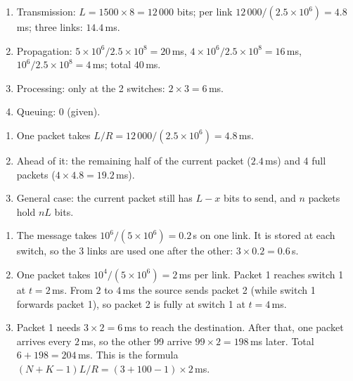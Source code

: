 \begin{enumerate}
  \item Transmission: $L=1500\times8=12\,000$ bits; per link $12\,000/(2.5\times10^6)=4.8$\,ms; three links: $14.4$\,ms.
  \item Propagation: $5\times10^6/2.5\times10^8=20$\,ms, $4\times10^6/2.5\times10^8=16$\,ms, $10^6/2.5\times10^8=4$\,ms; total $40$\,ms.
  \item Processing: only at the 2 switches: $2\times3=6$\,ms.
  \item Queuing: $0$ (given).
\end{enumerate}

\begin{enumerate}
  \item One packet takes $L/R=12\,000/(2.5\times10^6)=4.8$\,ms.
  \item Ahead of it: the remaining half of the current packet ($2.4$\,ms) and 4 full packets ($4\times4.8=19.2$\,ms).
  \item General case: the current packet still has $L-x$ bits to send, and $n$ packets hold $nL$ bits.
\end{enumerate}

\begin{enumerate}
  \item[(a)] The message takes $10^6/(5\times10^6)=0.2$\,s on one link. It is stored at each switch, so the 3 links are used one after the other: $3\times0.2=0.6$\,s.
  \item[(b)] One packet takes $10^4/(5\times10^6)=2$\,ms per link. Packet 1 reaches switch 1 at $t=2$\,ms. From $2$ to $4$\,ms the source sends packet 2 (while switch 1 forwards packet 1), so packet 2 is fully at switch 1 at $t=4$\,ms.
  \item[(c)] Packet 1 needs $3\times2=6$\,ms to reach the destination. After that, one packet arrives every $2$\,ms, so the other 99 arrive $99\times2=198$\,ms later. Total $6+198=204$\,ms. This is the formula $(N+K-1)L/R=(3+100-1)\times2$\,ms.
\end{enumerate}

